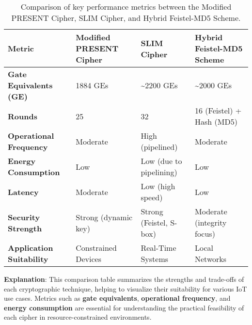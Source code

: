 \documentclass{article}
\begin{document}
\begin{table}[H]
    \centering
    \begin{tabularx}{\textwidth}{|l|X|X|X|}
        \hline
        \textbf{Metric} & \textbf{Modified PRESENT Cipher} & \textbf{SLIM Cipher} & \textbf{Hybrid Feistel-MD5 Scheme} \\ \hline
        \textbf{Gate Equivalents (GE)} & 1884 GEs & \textasciitilde 2200 GEs & \textasciitilde 2000 GEs \\ \hline
        \textbf{Rounds} & 25 & 32 & 16 (Feistel) + Hash (MD5) \\ \hline
        \textbf{Operational Frequency} & Moderate & High (pipelined) & Moderate \\ \hline
        \textbf{Energy Consumption} & Low & Low (due to pipelining) & Low \\ \hline
        \textbf{Latency} & Moderate & Low (high speed) & Low \\ \hline
        \textbf{Security Strength} & Strong (dynamic key) & Strong (Feistel, S-box) & Moderate (integrity focus) \\ \hline
        \textbf{Application Suitability} & Constrained Devices & Real-Time Systems & Local Networks \\ \hline
    \end{tabularx}
    \caption{Comparison of key performance metrics between the Modified PRESENT Cipher, SLIM Cipher, and Hybrid Feistel-MD5 Scheme.}
    \label{tab:performance_comparison}
\end{table}

\noindent\textbf{Explanation}: This comparison table summarizes the strengths and trade-offs of each cryptographic technique, helping to visualize their suitability for various IoT use cases. Metrics such as \textbf{gate equivalents}, \textbf{operational frequency}, and \textbf{energy consumption} are essential for understanding the practical feasibility of each cipher in resource-constrained environments.
\end{document}
